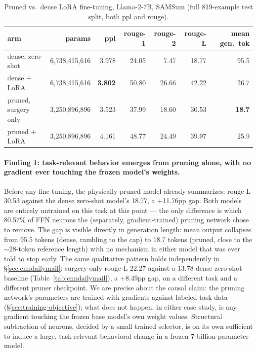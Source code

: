 \documentclass[11pt]{article}
\begin{document}
\begin{table}[htbp]
\centering
\small
\caption{Pruned vs.\ dense LoRA fine-tuning, Llama-2-7B, SAMSum (full 819-example test split, both ppl and rouge).}
\label{tab:samsum}
\begin{tabular}{@{}lrrrrrr@{}}
\toprule
arm & params & ppl & rouge-1 & rouge-2 & rouge-L & mean gen.\ tok \\
\midrule
dense, zero-shot     & 6{,}738{,}415{,}616 & 3.978 & 24.05 & 7.47  & 18.77 & 95.5 \\
dense + LoRA          & 6{,}738{,}415{,}616 & \textbf{3.802} & 50.80 & 26.66 & 42.22 & 26.7 \\
pruned, surgery only & 3{,}250{,}896{,}896 & 3.523 & 37.99 & 18.60 & 30.53 & \textbf{18.7} \\
pruned + LoRA          & 3{,}250{,}896{,}896 & 4.161 & 48.77 & 24.49 & 39.97 & 25.9 \\
\bottomrule
\end{tabular}
\end{table}

\paragraph{Finding 1: task-relevant behavior emerges from pruning alone, with no gradient ever touching the frozen model's weights.} Before any fine-tuning, the physically-pruned model already summarizes: rouge-L 30.53 against the dense zero-shot model's 18.77, a
+11.76pp gap. Both models are entirely untrained on this task at this point
--- the only difference is which 80.57\% of FFN neurons the (separately,
gradient-trained) pruning network chose to remove. The gap is visible
directly in generation length: mean output collapses from 95.5 tokens
(dense, rambling to the cap) to 18.7 tokens (pruned, close to the
$\sim$28-token reference length) with no mechanism in either model that was
ever told to stop early. The same qualitative pattern holds independently in
\S\ref{sec:cnndailymail}: surgery-only rouge-L 22.27 against a 13.78 dense
zero-shot baseline (Table~\ref{tab:cnndailymail}), a +8.49pp gap, on a
different task and a different pruner checkpoint. We are precise about the
causal claim: the pruning network's parameters are trained with gradients
against labeled task data (\S\ref{sec:training-objective}); what does not
happen, in either case study, is any gradient touching the frozen base
model's own weight values. Structural subtraction of neurons, decided by a
small trained selector, is on its own sufficient to induce a large,
task-relevant behavioral change in a frozen 7-billion-parameter model.
\end{document}
